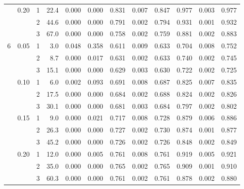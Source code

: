 \begin{table}[ht]
\begin{tabular}{rrr rrr rrr rrr}
 & 0.20 & 1 & 22.4 & 0.000 & 0.000 & 0.831 & 0.007 & 0.847 & 0.977 & 0.003 & 0.977 \\
 &  & 2 & 44.6 & 0.000 & 0.000 & 0.791 & 0.002 & 0.794 & 0.931 & 0.001 & 0.932 \\
 &  & 3 & 67.0 & 0.000 & 0.000 & 0.758 & 0.002 & 0.759 & 0.881 & 0.002 & 0.883 \\
\midrule
6 & 0.05 & 1 & 3.0 & 0.048 & 0.358 & 0.611 & 0.009 & 0.633 & 0.704 & 0.008 & 0.752 \\
 &  & 2 & 8.7 & 0.000 & 0.017 & 0.631 & 0.002 & 0.633 & 0.740 & 0.002 & 0.745 \\
 &  & 3 & 15.1 & 0.000 & 0.000 & 0.629 & 0.003 & 0.630 & 0.722 & 0.002 & 0.725 \\
 & 0.10 & 1 & 6.0 & 0.002 & 0.093 & 0.691 & 0.008 & 0.687 & 0.825 & 0.007 & 0.835 \\
 &  & 2 & 17.5 & 0.000 & 0.000 & 0.684 & 0.002 & 0.688 & 0.824 & 0.002 & 0.826 \\
 &  & 3 & 30.1 & 0.000 & 0.000 & 0.681 & 0.003 & 0.684 & 0.797 & 0.002 & 0.802 \\
 & 0.15 & 1 & 9.0 & 0.000 & 0.021 & 0.717 & 0.008 & 0.728 & 0.879 & 0.006 & 0.886 \\
 &  & 2 & 26.3 & 0.000 & 0.000 & 0.727 & 0.002 & 0.730 & 0.874 & 0.001 & 0.877 \\
 &  & 3 & 45.2 & 0.000 & 0.000 & 0.726 & 0.002 & 0.726 & 0.848 & 0.002 & 0.849 \\
 & 0.20 & 1 & 12.0 & 0.000 & 0.005 & 0.761 & 0.008 & 0.761 & 0.919 & 0.005 & 0.921 \\
 &  & 2 & 35.0 & 0.000 & 0.000 & 0.765 & 0.002 & 0.765 & 0.909 & 0.001 & 0.910 \\
 &  & 3 & 60.3 & 0.000 & 0.000 & 0.761 & 0.002 & 0.761 & 0.878 & 0.002 & 0.880 \\
\bottomrule
\end{tabular}
\end{table}
